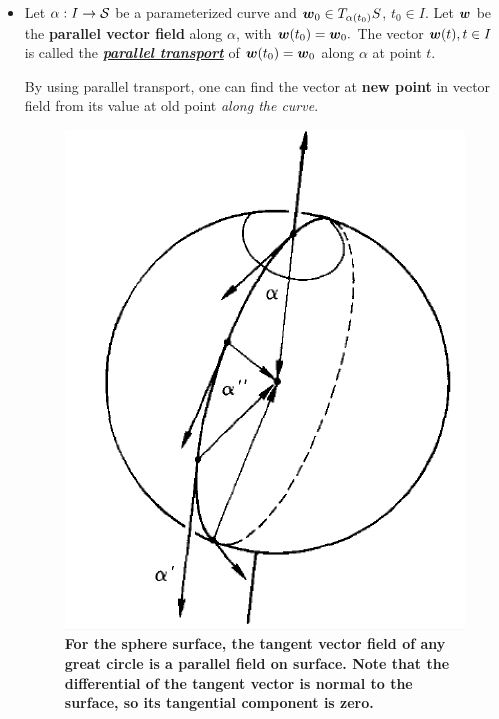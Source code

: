 \documentclass[11pt]{article}
\begin{document}
\begin{itemize}
\item \begin{definition}
Let $\alpha: I \rightarrow {\mathcal S}$ be a parameterized curve and $\boldsymbol{w}_{0}\in T_{\alpha(t_{0})}S$, $t_{0}\in I$. Let $\boldsymbol{w}$ be the \textbf{parallel vector field} along $\alpha$, with $\boldsymbol{w}(t_{0}) = \boldsymbol{w}_{0}.$ The vector $\boldsymbol{w}(t), t\in I$ is called the \underline{\emph{\textbf{parallel transport}}} of $\boldsymbol{w}(t_{0})= \boldsymbol{w}_{0}$ along $\alpha$ at point $t$.
\end{definition}
By using parallel transport, one can find the vector at \textbf{new point} in vector field from its value at old point \emph{along the curve}.  

\begin{figure}[tb]
\centering
\begin{minipage}{0.6\linewidth}
 \centerline{\includegraphics[scale = 0.43]{para_transp.png}}
\end{minipage}
\caption{\scriptsize
\textbf{For the sphere surface, the tangent vector field of any great circle is a parallel field on surface. Note that the differential of the tangent vector is normal to the surface, so its tangential component is zero.  }}
\end{figure}


\end{itemize}
\end{document}
